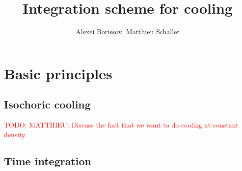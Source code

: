 \documentclass[fleqn, usenatbib, useAMS, a4paper]{mnras}
\title{Integration scheme for cooling}
\author{Alexei Borissov, Matthieu Schaller}
\newcommand{\todo}[1]{{\textcolor{red}{TODO: #1}\\}}
\begin{document}
\maketitle

\section{Basic principles}

\subsection{Isochoric cooling}

\todo{MATTHIEU: Discuss the fact that we want to do cooling at constant
  density.}

\subsection{Time integration}
\end{document}
